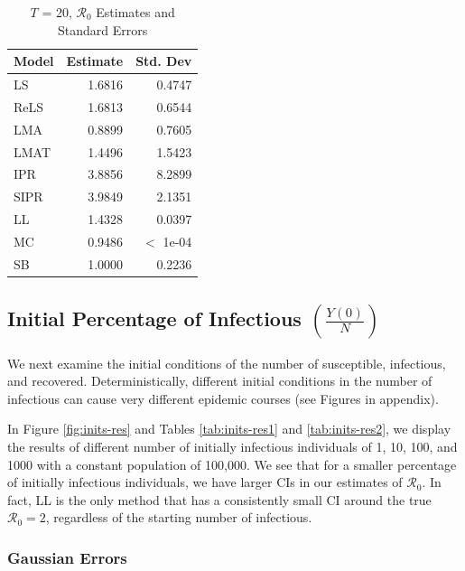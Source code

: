 \documentclass[12pt]{article}
\newcommand{\rr}{\ensuremath{\mathcal{R}_0}}
\begin{document}
\begin{table}[H]
	\centering
	\begin{tabular}[t]{l|r|r}
		\hline
		Model & Estimate & Std. Dev\\
		\hline
		LS & 1.6816 & 0.4747\\
		\hline
		ReLS & 1.6813 & 0.6544\\
		\hline
		LMA & 0.8899 & 0.7605\\
		\hline
		LMAT & 1.4496 & 1.5423\\
		\hline
		IPR & 3.8856 & 8.2899\\
		\hline
		SIPR & 3.9849 & 2.1351\\
		\hline
		LL & 1.4328 & 0.0397\\
		\hline
		MC & 0.9486 & $<$ 1e-04\\
		\hline
		SB & 1.0000 & 0.2236\\
		\hline
	\end{tabular}
	\caption{$T$ = 20, $\rr$ Estimates and Standard Errors}
\end{table}


\subsection{Initial Percentage of Infectious $\left (\frac{Y(0)}{N}\right)$}\label{sec:res-inf}
We next examine the initial conditions of the number of susceptible, infectious, and recovered.  Deterministically, different initial conditions in the number of infectious can cause very different epidemic courses (see Figures in appendix).

In Figure \ref{fig:inits-res} and Tables \ref{tab:inits-res1} and \ref{tab:inits-res2}, we display the results of different number of initially infectious individuals of 1, 10, 100, and 1000 with a constant population of 100,000.  We see that for a smaller percentage of initially infectious individuals, we have larger CIs in our estimates of $\rr$.  In fact, LL is the only method that has a consistently small CI around the true $\rr=2$, regardless of the starting number of infectious.

\subsubsection{Gaussian Errors}
\end{document}
